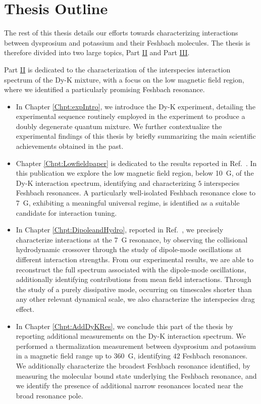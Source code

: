 \chapter{Thesis Outline}
\label{Chpt:Outline}

The rest of this thesis details our efforts towards characterizing interactions between dysprosium and potassium and their Feshbach molecules. The thesis is therefore divided into two large topics, Part \hyperref[pt:questDyKFR]{II} and Part \hyperref[pt:MakingProbing]{III}.

Part \hyperref[pt:questDyKFR]{II} is dedicated to the characterization of the interspecies interaction spectrum of the Dy-K mixture, with a focus on the low magnetic field region, where we identified a particularly promising Feshbach resonance.
\begin{itemize}
	\item In Chapter \ref{Chpt:expIntro},  we introduce the Dy-K experiment,  detailing the experimental sequence routinely employed in the experiment to produce a doubly degenerate quantum mixture. We further contextualize the experimental findings of this thesis by briefly summarizing the main scientific achievements obtained in the past.
	
	\item Chapter \ref{Chpt:Lowfieldpaper} is dedicated to the results reported in Ref.~\cite{Ye2022ool}. In this publication we explore the low magnetic field region, below \SI{10}{G}, of the Dy-K interaction spectrum, identifying and characterizing $5$ interspecies Feshbach resonances. A particularly well-isolated Feshbach resonance close to \SI{7}{G}, exhibiting a meaningful universal regime, is identified as a suitable candidate for interaction tuning.
	
	\item  In Chapter \ref{Chpt:DipoleandHydro}, reported in Ref.~\cite{Ye2025dms}, we precisely characterize interactions at the \SI{7}{G} resonance, by observing the collisional hydrodynamic crossover through the study of dipole-mode oscillations at different interaction strengths. From our experimental results, we are able to reconstruct the full spectrum associated with the dipole-mode oscillations, additionally identifying contributions from mean field interactions. Through the study of a purely dissipative mode, occurring on timescales shorter than any other relevant dynamical scale, we also characterize the interspecies drag effect.   
	
	\item In  Chapter \ref{Chpt:AddDyKRes}, we conclude this part of the thesis by reporting additional measurements on the Dy-K interaction spectrum. We performed a thermalization measurement between dysprosium and potassium in a magnetic field range up to \SI{360}{G}, identifying $42$ Feshbach resonances. We additionally characterize the broadest Feshbach resonance identified, by measuring the molecular bound state underlying the Feshbach resonance, and we identify  the presence of additional narrow resonances located near the broad resonance pole.
	
\end{itemize}

